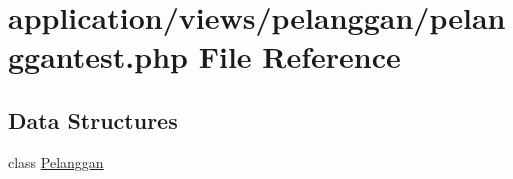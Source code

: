 \hypertarget{pelanggantest_8php}{}\section{application/views/pelanggan/pelanggantest.php File Reference}
\label{pelanggantest_8php}
\subsection*{Data Structures}
\begin{DoxyCompactItemize}
\item 
class \mbox{\hyperlink{class_pelanggan}{Pelanggan}}
\end{DoxyCompactItemize}
